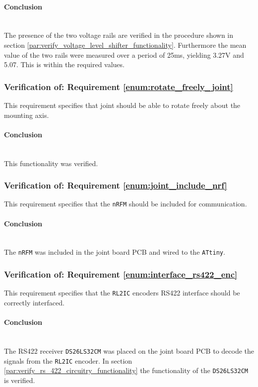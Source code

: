 \paragraph{Conclusion}~\\
The presence of the two voltage rails are verified in the procedure shown in section \ref{par:verify_voltage_level_shifter_functionality}.
Furthermore the mean value of the two rails were measured over a period of 25ms, yielding 3.27V and 5.07.
This is within the required values.

\subsubsection{Verification of: Requirement \ref{enum:rotate_freely_joint}} %
\label{ssub:verification_of_requirement_enum:rotate_freely_joint}
This requirement specifies that joint should be able to rotate freely about the mounting axis.

\paragraph{Conclusion}~\\
This functionality was verified.


\subsubsection{Verification of: Requirement \ref{enum:joint_include_nrf}} %
\label{ssub:verification_of_requirement_enum:joint_include_nrf}
This requirement specifies that the \texttt{nRFM} should be included for communication.

\paragraph{Conclusion}~\\
The \texttt{nRFM} was included in the joint board PCB and wired to the \texttt{ATtiny}.

\subsubsection{Verification of: Requirement \ref{enum:interface_rs422_enc}} %
\label{ssub:verification_of_requirement_enum:interface_rs422_enc}
This requirement specifies that the \texttt{RL2IC} encoders RS422 interface should be correctly interfaced.

\paragraph{Conclusion}~\\
The RS422 receiver \texttt{DS26LS32CM} was placed on the joint board PCB to decode the signals from the \texttt{RL2IC} encoder.
In section \ref{par:verify_rs_422_circuitry_functionality} the functionality of the \texttt{DS26LS32CM} is verified. 

